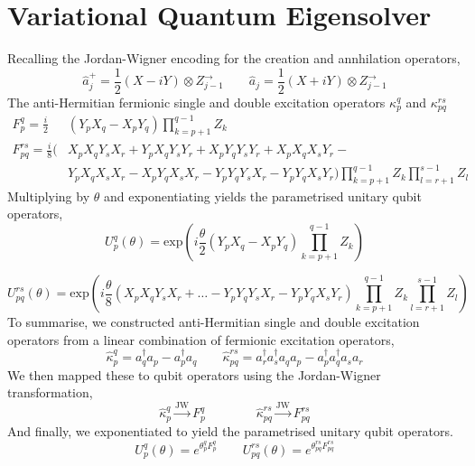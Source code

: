 \section{Variational Quantum Eigensolver}
Recalling the Jordan-Wigner encoding for the creation and annhilation operators,
\begin{equation*}
    \hat a_j^+ = \frac{1}{2} (X - iY) \otimes Z^\rightarrow_{j-1} \qquad
    \hat a_j = \frac{1}{2} (X + iY) \otimes Z^\rightarrow_{j-1}
\end{equation*}
The anti-Hermitian fermionic single and double excitation operators $\kappa_p^q$ and $\kappa_{pq}^{rs}$
\begin{align*}
    F_p^q = \frac{i}{2} & (Y_p X_q - X_p Y_q) \prod_{k=p+1}^{q-1} Z_k \\
    F_{pq}^{rs} = \frac{i}{8} (
      & X_p X_q Y_s X_r +
        Y_p X_q Y_s Y_r +
        X_p Y_q Y_s Y_r +
        X_p X_q X_s Y_r - \\
      & Y_p X_q X_s X_r -
        X_p Y_q X_s X_r -
        Y_p Y_q Y_s X_r -
        Y_p Y_q X_s Y_r )
    \prod_{k=p+1}^{q-1} Z_k
    \prod_{l=r+1}^{s-1} Z_l
\end{align*}
Multiplying by $\theta$ and exponentiating yields the parametrised unitary qubit operators,
\begin{equation*}
    U^q_p (\theta) =
    \text{exp} \left( i
    \frac{\theta}{2} (Y_p X_q - X_p Y_q) \prod_{k=p+1}^{q-1} Z_k \right)
\end{equation*}

\begin{equation*}
    U^{rs}_{pq} (\theta) = \text{exp} \left( i \frac{\theta}{8} (
    X_p X_q Y_s X_r
    + \dots -
    Y_p Y_q Y_s X_r -
    Y_p Y_q X_s Y_r )
    \prod_{k=p+1}^{q-1} Z_k
    \prod_{l=r+1}^{s-1} Z_l
    \right)
\end{equation*}
To summarise, we constructed anti-Hermitian single and double excitation operators from a linear combination of fermionic excitation operators,
\begin{equation*}
    \hat\kappa_p^q = a_q^\dagger a_p - a_p^\dagger a_q \qquad
    \hat\kappa_{pq}^{rs} =
    a_r^\dagger a_s^\dagger a_q a_p - a_p^\dagger a_q^\dagger a_s a_r
\end{equation*}\smallskip
We then mapped these to qubit operators using the Jordan-Wigner transformation,
\begin{equation*}
    \hat\kappa_p^q \xrightarrow{\text{JW}} F_p^q \qquad\qquad
    \hat\kappa_{pq}^{rs} \xrightarrow{\text{JW}} F_{pq}^{rs}
\end{equation*}
And finally, we exponentiated to yield the parametrised unitary qubit operators.
\begin{equation*}
    U^q_p (\theta) = e^{\theta^q_p F_p^q} \qquad
    U^{rs}_{pq}(\theta) = e^{\theta_{pq}^{rs} F_{pq}^{rs}}
\end{equation*}

